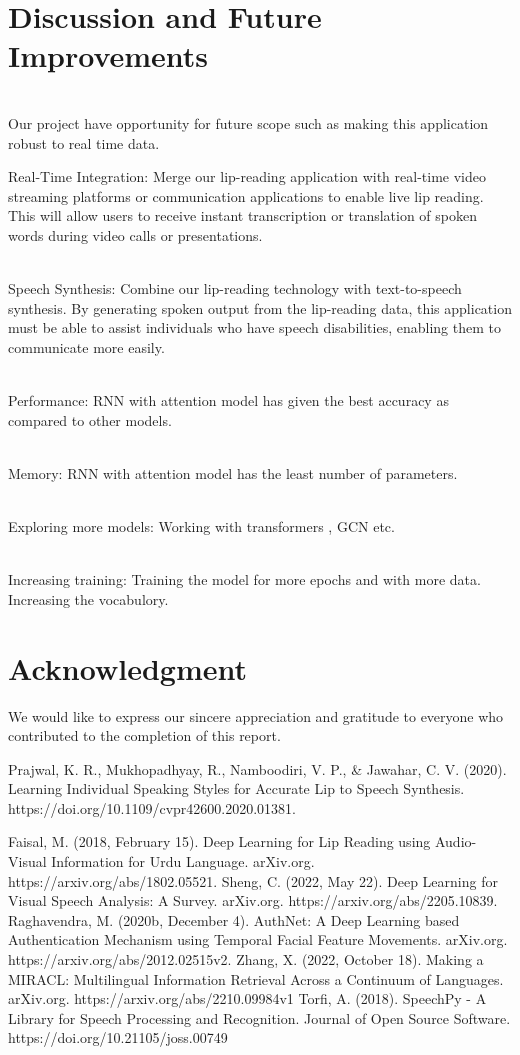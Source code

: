 \documentclass[conference]{IEEEtran}
\begin{document}
\section{Discussion and Future Improvements}

\\ Our project have opportunity for future scope such as making this application robust to real time data.

Real-Time Integration: Merge our lip-reading application with real-time video streaming platforms or communication applications to enable live lip reading. This will allow users to receive instant transcription or translation of spoken words during video calls or presentations.

\\ Speech Synthesis: Combine our lip-reading technology with text-to-speech synthesis. By generating spoken output from the lip-reading data, this application must be able to assist individuals who have speech disabilities, enabling them to communicate more easily.

\\ Performance: RNN with attention model has given the best accuracy as compared to other models. 

\\ Memory: RNN with attention model has the least number of parameters.

\\ Exploring more models: Working with transformers , GCN etc.

\\ Increasing training: Training the model for more epochs and with more data. Increasing the vocabulory.
\section*{Acknowledgment}

We would like to express our sincere appreciation and gratitude to everyone who contributed to the completion of this report.


\begin{thebibliography}{00}
 Prajwal, K. R., Mukhopadhyay, R., Namboodiri, V. P., & Jawahar, C. V. (2020). Learning Individual Speaking Styles for Accurate Lip to Speech Synthesis. https://doi.org/10.1109/cvpr42600.2020.01381.

 Faisal, M. (2018, February 15). Deep Learning for Lip Reading using Audio-Visual Information for Urdu Language. arXiv.org. https://arxiv.org/abs/1802.05521.
 Sheng, C. (2022, May 22). Deep Learning for Visual Speech Analysis: A Survey. arXiv.org. https://arxiv.org/abs/2205.10839.
 Raghavendra, M. (2020b, December 4). AuthNet: A Deep Learning based Authentication Mechanism using Temporal Facial Feature Movements. arXiv.org. https://arxiv.org/abs/2012.02515v2.
 Zhang, X. (2022, October 18). Making a MIRACL: Multilingual Information Retrieval Across a Continuum of Languages. arXiv.org. https://arxiv.org/abs/2210.09984v1
 Torfi, A. (2018). SpeechPy - A Library for Speech Processing and Recognition. Journal of Open Source Software. https://doi.org/10.21105/joss.00749
\end{thebibliography}
\vspace{12pt}
\end{document}
